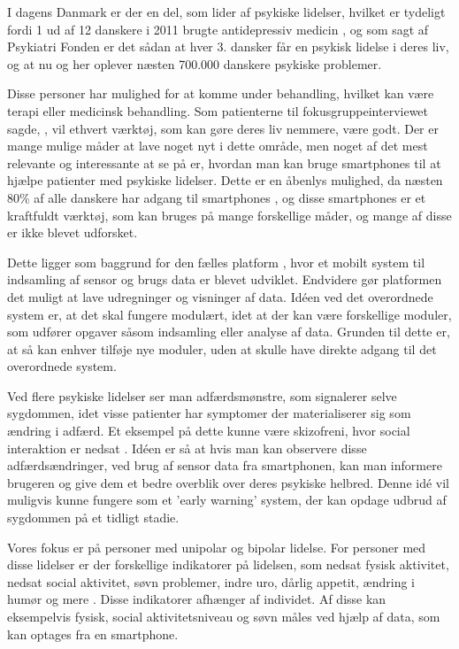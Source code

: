 I dagens Danmark er der en del, som lider af psykiske lidelser, hvilket er tydeligt fordi 1 ud af 12 danskere i 2011 brugte antidepressiv medicin \citep{misc:forbrugAntidepressiva}, og som sagt af Psykiatri Fonden er det sådan at hver 3. dansker får en psykisk lidelse i deres liv, og at nu og her oplever næsten 700.000 danskere psykiske problemer\citep{psykiatrifonden}. 

Disse personer har mulighed for at komme under behandling, hvilket kan være terapi eller medicinsk behandling.
Som patienterne til fokusgruppeinterviewet sagde, \citep[Kapitel 1, Sektion 5]{misc:faellesrapp}, vil ethvert værktøj, som kan gøre deres liv nemmere, være godt.
Der er mange mulige måder at lave noget nyt i dette område, men noget af det mest relevante og interessante at se på er, hvordan man kan bruge smartphones til at hjælpe patienter med psykiske lidelser.
Dette er en åbenlys mulighed, da næsten 80\% af alle danskere har adgang til smartphones \citep{misc:dstElektronik}, og disse smartphones er et kraftfuldt værktøj, som kan bruges på mange forskellige måder, og mange af disse er ikke blevet udforsket.

Dette ligger som baggrund for den fælles platform \citep{misc:faellesrapp}, hvor et mobilt system til indsamling af sensor og brugs data er blevet udviklet. 
Endvidere gør platformen det muligt at lave udregninger og visninger af data.
Idéen ved det overordnede system er, at det skal fungere modulært, idet at der kan være forskellige moduler, som udfører opgaver såsom indsamling eller analyse af data. 
Grunden til dette er, at så kan enhver tilføje nye moduler, uden at skulle have direkte adgang til det overordnede system.

Ved flere psykiske lidelser ser man adfærdsmønstre, som signalerer selve sygdommen, idet visse patienter har symptomer der materialiserer sig som ændring i adfærd.
Et eksempel på dette kunne være skizofreni, hvor social interaktion er nedsat \citep{misc:negativeSymptomsSchizo}.
Idéen er så at hvis man kan observere disse adfærdsændringer, ved brug af sensor data fra smartphonen, kan man informere brugeren og give dem et bedre overblik over deres psykiske helbred.
Denne idé vil muligvis kunne fungere som et 'early warning' system, der kan opdage udbrud af sygdommen på et tidligt stadie.

Vores fokus er på personer med unipolar og bipolar lidelse. 
For personer med disse lidelser er der forskellige indikatorer på lidelsen, som nedsat fysisk aktivitet, nedsat social aktivitet, søvn problemer, indre uro, dårlig appetit, ændring i humør og mere \citep{misc:faellesrapp}.
Disse indikatorer afhænger af individet.
Af disse kan eksempelvis fysisk, social aktivitetsniveau og søvn måles ved hjælp af data, som kan optages fra en smartphone.

